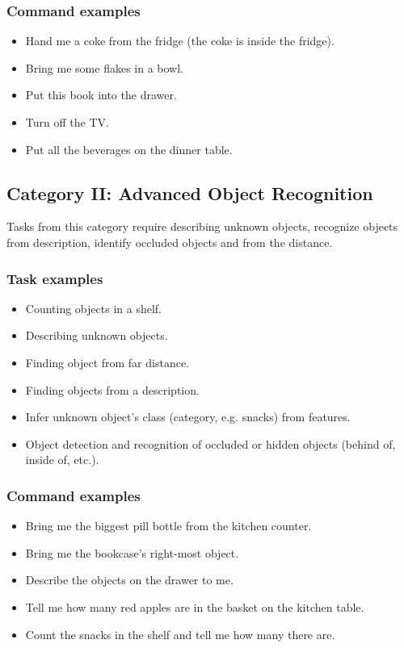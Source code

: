 \subsubsection{Command examples}
\begin{itemize}
	\item Hand me a coke from the fridge (the coke is inside the fridge).
	\item Bring me some flakes in a bowl.
	\item Put this book into the drawer.
	\item Turn off the TV.
	\item Put all the beverages on the dinner table.
\end{itemize}



%
%
\subsection{Category II: Advanced Object Recognition}
\label{sec:eegpsr-category2-explained}
Tasks from this category require describing unknown objects, recognize objects from description, identify occluded objects and from the distance.

\subsubsection{Task examples}
\begin{itemize}
	\item Counting objects in a shelf.
	\item Describing unknown objects.
	\item Finding object from far distance.
	\item Finding objects from a description.
	\item Infer unknown object's class (category, e.g. snacks) from features.
	\item Object detection and recognition of occluded or hidden objects (behind of, inside of, etc.).
\end{itemize}

\subsubsection{Command examples}
\begin{itemize}
	\item Bring me the biggest pill bottle from the kitchen counter.
	\item Bring me the bookcase's right-most object.
	\item Describe the objects on the drawer to me.
	\item Tell me how many red apples are in the basket on the kitchen table.
	\item Count the snacks in the shelf and tell me how many there are.
\end{itemize}


